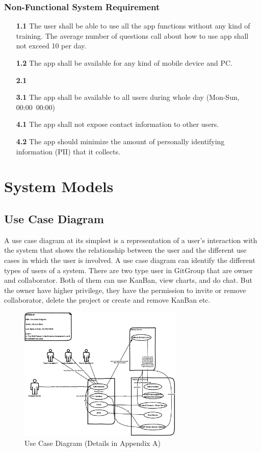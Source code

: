 \documentclass[12pt,a4paper]{report}
\begin{document}
	\subsection{Non-Functional System Requirement}
		\begin{enumerate}
			\item[\textbf{1.1}] The user shall be able to use all the app functions without any kind of training. The average number of questions call about how to use app shall not exceed 10 per day.
			\item[\textbf{1.2}] The app shall be available for any kind of mobile device and PC.
			\item[\textbf{2.1}]
			\item[\textbf{3.1}] The app shall be available to all users during whole day (Mon-Sun, 00:00~00:00)
			\item[\textbf{4.1}] The app shall not expose contact information to other users. 
			\item[\textbf{4.2}] The app should minimize the amount of personally identifying information (PII) that it collects.
		\end{enumerate}
	
\chapter{System Models}
\section{Use Case Diagram}
A use case diagram at its simplest is a representation of a user's interaction with the system that shows the relationship between the user and the different use cases in which the user is involved. A use case diagram can identify the different types of users of a system. There are two type user in GitGroup that are owner and collaborator. Both of them can use KanBan, view charts, and do chat. But the owner have higher privilege, they have the permission to invite or remove collaborator, delete the project or create and remove KanBan etc.
\begin{figure}[H]
	\centering
	\includegraphics[width=0.7\textwidth]{./pics/UseCaseDiagram.png}
	\caption{Use Case Diagram (Details in Appendix A)}
\end{figure}
\end{document}
